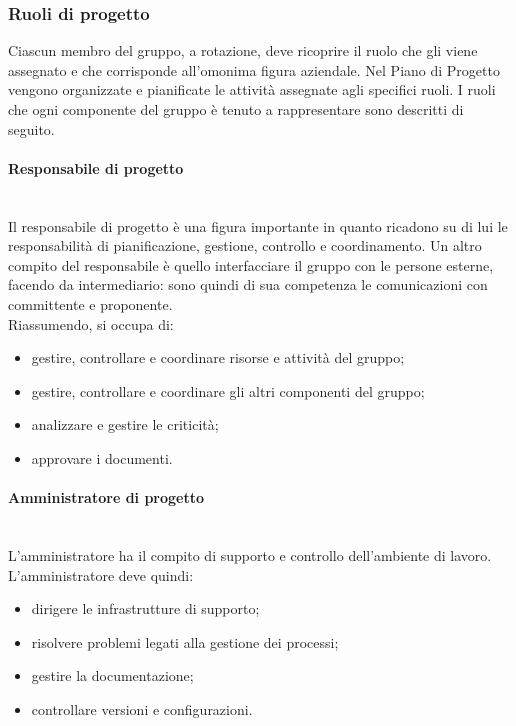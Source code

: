 		\subsubsection{Ruoli di progetto}
		Ciascun membro del gruppo, a rotazione, deve ricoprire il ruolo che gli viene assegnato e che corrisponde all'omonima figura aziendale. Nel Piano di Progetto vengono organizzate e pianificate le attività assegnate agli specifici ruoli. I ruoli che ogni componente del gruppo è tenuto a rappresentare sono descritti di seguito.
			\paragraph{Responsabile di progetto} \mbox{}\\
			Il responsabile di progetto è una figura importante in quanto ricadono su di lui le responsabilità di pianificazione, gestione, controllo e coordinamento. Un altro compito del responsabile è quello interfacciare il gruppo con le persone esterne, facendo da intermediario: sono quindi di sua competenza le comunicazioni con committente e proponente. \\
			Riassumendo, si occupa di:
			\begin{itemize}
				\item gestire, controllare e coordinare risorse e attività del gruppo;
				\item  gestire, controllare e coordinare gli altri componenti del gruppo;
				\item analizzare e gestire le criticità;
				\item approvare i documenti.
			\end{itemize}
			\paragraph{Amministratore di progetto} \mbox{}\\
			L'amministratore ha il compito di supporto e controllo dell'ambiente di lavoro. \\
			L'amministratore deve quindi:
			\begin{itemize}
				\item dirigere le infrastrutture di supporto;
				\item risolvere problemi legati alla gestione dei processi;
				\item gestire la documentazione;
				\item controllare versioni e configurazioni.
			\end{itemize}
